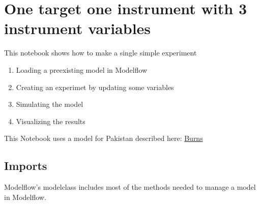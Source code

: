 \documentclass[letterpaper,10pt,english]{jupyterBook}
\begin{document}
\chapter{One target one instrument with 3 instrument variables}
\label{\detokenize{content/howto/targetinstruments/One target one instrument with 3 instrument variables:one-target-one-instrument-with-3-instrument-variables}}\label{\detokenize{content/howto/targetinstruments/One target one instrument with 3 instrument variables::doc}}
\sphinxAtStartPar
This notebook shows how to make a single simple experiment
\begin{enumerate}
%
\item {} 
\sphinxAtStartPar
Loading a pre\sphinxhyphen{}existing model in Modelflow

\item {} 
\sphinxAtStartPar
Creating an experimet by updating some variables

\item {} 
\sphinxAtStartPar
Simulating the model

\item {} 
\sphinxAtStartPar
Visualizing the results

\end{enumerate}

\sphinxAtStartPar
This Notebook uses a  model for Pakistan described here: \hyperlink{cite.content/litterature:id14}{Burns }


\section{Imports}
\label{\detokenize{content/howto/targetinstruments/One target one instrument with 3 instrument variables:imports}}
\sphinxAtStartPar
Modelflow’s modelclass includes most of the methods needed to manage a model in Modelflow.
\end{document}
